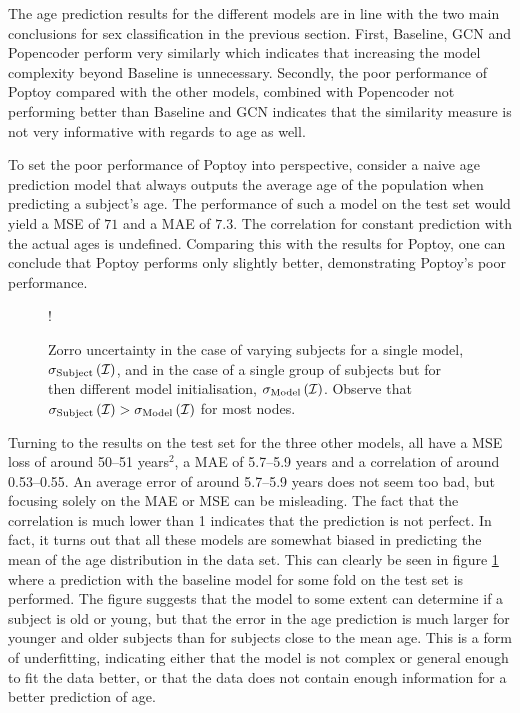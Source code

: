The age prediction results for the different models are in line with the two main conclusions for sex classification in the previous section. First, Baseline, GCN and Popencoder perform very similarly which indicates that increasing the model complexity beyond Baseline is unnecessary. Secondly, the poor performance of Poptoy compared with the other models, combined with Popencoder not performing better than Baseline and GCN indicates that the similarity measure is not very informative with regards to age as well. 

To set the poor performance of Poptoy into perspective, consider a naive age prediction model that always outputs the average age of the population when predicting a subject's age. The performance of such a model on the test set would yield a MSE of $71$ and a MAE of $7.3$. The correlation for constant prediction with the actual ages is undefined. Comparing this with the results for Poptoy, one can conclude that Poptoy performs only slightly better, demonstrating Poptoy's poor performance.

\begin{figure}[ht]
    \centering
    \begin{center}
        \resizebox {0.6\linewidth} {!} {
            
        }
    \end{center}
    \caption{Zorro uncertainty in the case of varying subjects for a single model, $\sigma_{\rm{Subject}}\left(\mathcal{I}\right)$, and in the case of a single group of subjects but for then different model initialisation, $\sigma_{\rm{Model}}\left(\mathcal{I}\right)$. Observe that $\sigma_{\rm{Subject}}\left(\mathcal{I}\right) > \sigma_{\rm{Model}}\left(\mathcal{I}\right)$ for most nodes.}
    \label{fig:age_regression}
\end{figure}

Turning to the results on the test set for the three other models, all have a MSE loss of around 50--51 years$^2$, a MAE of 5.7--5.9 years and a correlation of around 0.53--0.55. An average error of around 5.7--5.9 years does not seem too bad, but focusing solely on the MAE or MSE can be misleading. The fact that the correlation is much lower than 1 indicates that the prediction is not perfect. In fact, it turns out that all these models are somewhat biased in predicting the mean of the age distribution in the data set. This can clearly be seen in figure \cref{fig:age_regression} where a prediction with the baseline model for some fold on the test set is performed. The figure suggests that the model to some extent can determine if a subject is old or young, but that the error in the age prediction is much larger for younger and older subjects than for subjects close to the mean age. This is a form of underfitting, indicating either that the model is not complex or general enough to fit the data better, or that the data does not contain enough information for a better prediction of age.

